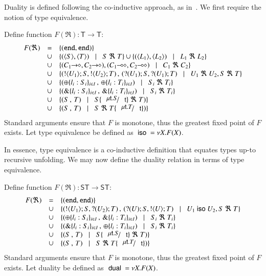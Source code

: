 Duality is defined following the co-inductive
approach, as in~\cite{GH05,TGC14}.
We first require the notion of type equivalence.
%
\begin{definition}\myrm
\label{def:type_equiv}
	Define function $F(\Re): \mathsf{T} \longrightarrow \mathsf{T}$:
	\[
		\begin{array}{rcl}
			F(\Re) 	&=&	\set{(\tinact, \tinact)} \\
				&\cup&	\set{(\chtype{S}, \chtype{T}) \bnfbar S\ \Re\ T} \cup \set{(\chtype{L_1}, \chtype{L_2}) \bnfbar L_1\ \Re\ L_2}\\
				&\cup&	\set{(\shot{C_1}, \shot{C_2}), (\lhot{C_1}, \lhot{C_2}) \bnfbar C_1\ \Re\ C_2}\\
				&\cup&	\set{(\btout{U_1} S, \btout{U_2} T)\,,\, (\btinp{U_1} S, \btinp{U_1} T) \bnfbar U_1\ \Re\ U_2, S\ \Re\ T}\\
				&\cup&	\set{(\btsel{l_i: S_i}_{i \in I} \,,\, \btsel{l_i: T_i}_{i \in I}) \bnfbar  S_i\ \Re\ T_i}\\
				&\cup&	\set{(\btbra{l_i: S_i}_{i \in I}\,,\, \btbra{l_i: T_i}_{i \in I}) \bnfbar S_i\ \Re\ T_i}\\
				&\cup&	\set{(S\,,\, T) \bnfbar S\subst{\trec{t}{S}}{\vart{t}}\ \Re\ T)} \\
				&\cup&	\set{(S\,,\, T) \bnfbar S\ \Re\ T\subst{\trec{t}{T}}{\vart{t}})}
		\end{array}
	\]	
	\noi Standard arguments ensure that $F$ is monotone, thus the greatest fixed point
	of $F$ exists. Let type equivalence be defined as $\ \mathsf{iso}\  = \nu X. F(X)$.
\end{definition}
%
\noi In essence, type equivalence is a co-inductive definition that
equates types up-to recursive unfolding.
We may now define the duality relation in terms of type equivalence.
\begin{definition}[Duality]\myrm
\label{def:type_dual}
	Define function $F(\Re): \mathsf{ST} \longrightarrow \mathsf{ST}$:
	\[
		\begin{array}{rcl}
			F(\Re) 	&=&	\set{(\tinact, \tinact)}\\
				&\cup&	\set{(\btout{U_1} S, \btinp{U_2} T)\,,\, (\btinp{U} S, \btout{U} T) \bnfbar U_1 \iso U_2, S\ \Re\ T}\\
				&\cup&	\set{(\btsel{l_i: S_i}_{i \in I} \,,\, \btbra{l_i: T_i}_{i \in I}) \bnfbar  S_i\ \Re\ T_i}\\
				&\cup&	\set{(\btbra{l_i: S_i}_{i \in I}\,,\, \btsel{l_i: T_i}_{i \in I}) \bnfbar S_i\ \Re\ T_i}\\
				&\cup&	\set{(S\,,\, T) \bnfbar S\subst{\trec{t}{S}}{\vart{t}}\ \Re\ T)}\\
				&\cup&	\set{(S\,,\, T) \bnfbar S\ \Re\ T\subst{\trec{t}{T}}{\vart{t}})}
		\end{array}
	\]	
	\noi Standard arguments ensure that $F$ is monotone, thus the greatest fixed point
	of $F$ exists. Let duality be defined as $\ \mathsf{dual}\  = \nu X. F(X)$.
\end{definition}
